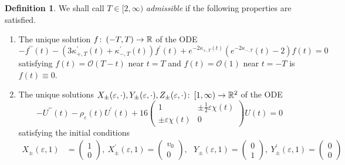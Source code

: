 \documentclass{article}
\numberwithin{equation}{section}        %
\theoremstyle{bfnote}
\theoremstyle{definition}
\newtheorem{Def}[thm]{Definition}           %
\theoremstyle{bfremark}
\newcommand{\col}{\colon \thinspace}        %
\newcommand{\R}{\mathbb{R}}                 %
\begin{document}
\begin{Def}     \label{Def: Admissible values 2}
    We shall call $T \in [2,\infty)$ \emph{admissible} if the following properties are satisfied.
    \begin{enumerate}
        \item The unique solution $f \col (-T,T) \to \R$ of the ODE
        \begin{equation*}
            - f^{\prime\prime}(t) - (3 \kappa^\prime_{+,T}(t) + \kappa^\prime_{-,T}(t)) f^\prime(t) + e^{-2\kappa_{+,T}(t)} (e^{-2\kappa_{-,T}}(t) - 2) f(t) = 0
        \end{equation*}
        satisfying $f(t) = \mathcal{O}(T-t)$ near $t = T$ and $f(t) = \mathcal{O}(1)$ near $t = -T$ is $f(t) \equiv 0$.

        \item The unique solutions $X_\pm(\varepsilon,\cdot), Y_\pm(\varepsilon,\cdot), Z_\pm(\varepsilon,\cdot) \col [1,\infty) \rightarrow \R^2$ of the ODE
            \begin{equation*}
                - U^{\prime\prime}(t) - \rho_\varepsilon(t) U^\prime(t) + 16 \begin{pmatrix} 1 & \pm \frac{1}{2} \varepsilon \chi(t) \\ \pm \varepsilon \chi(t) & 0 \end{pmatrix} U(t) = 0
            \end{equation*}
            satisfying the initial conditions
            \begin{align*}
                X_\pm(\varepsilon,1) & = 
                \begin{pmatrix}
                    1 \\
                    0
                \end{pmatrix}, ~ X^\prime_\pm(\varepsilon,1) = 
                \begin{pmatrix}
                    v_0 \\
                    0
                \end{pmatrix},
                ~~~ Y_\pm(\varepsilon,1) = 
                \begin{pmatrix}
                    0\\
                    1
                \end{pmatrix}, ~ Y^\prime_\pm(\varepsilon,1) = 
                \begin{pmatrix}
                    0\\
                    0
                \end{pmatrix} \\

\end{align*}
\end{enumerate}
\end{Def}
\end{document}

